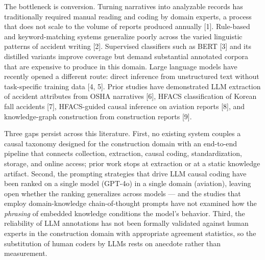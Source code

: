 \documentclass[11pt]{article}
\begin{document}
The bottleneck is conversion. Turning narratives into analyzable records has traditionally required manual reading and coding by domain experts, a process that does not scale to the volume of reports produced annually [1]. Rule-based and keyword-matching systems generalize poorly across the varied linguistic patterns of accident writing [2]. Supervised classifiers such as BERT [3] and its distilled variants improve coverage but demand substantial annotated corpora that are expensive to produce in this domain. Large language models have recently opened a different route: direct inference from unstructured text without task-specific training data [4, 5]. Prior studies have demonstrated LLM extraction of accident attributes from OSHA narratives [6], HFACS classification of Korean fall accidents [7], HFACS-guided causal inference on aviation reports [8], and knowledge-graph construction from construction reports [9].

Three gaps persist across this literature. First, no existing system couples a causal taxonomy designed for the construction domain with an end-to-end pipeline that connects collection, extraction, causal coding, standardization, storage, and online access; prior work stops at extraction or at a static knowledge artifact. Second, the prompting strategies that drive LLM causal coding have been ranked on a single model (GPT-4o) in a single domain (aviation), leaving open whether the ranking generalizes across models --- and the studies that employ domain-knowledge chain-of-thought prompts have not examined how the \textit{phrasing} of embedded knowledge conditions the model's behavior. Third, the reliability of LLM annotations has not been formally validated against human experts in the construction domain with appropriate agreement statistics, so the substitution of human coders by LLMs rests on anecdote rather than measurement.
\end{document}
